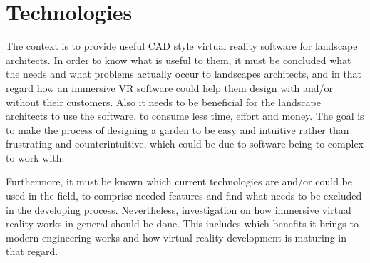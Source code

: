 	\section{Technologies}\label{sec:technologies}
		The context is to provide useful CAD style virtual reality software for landscape architects. In order to know what is useful to them, it must be concluded what the needs and what problems actually occur to landscapes architects, and in that regard how an immersive VR software could help them design with and/or without their customers. Also it needs to be beneficial for the landscape architects to use the software, to consume less time, effort and money. The goal is to make the process of designing a garden to be easy and intuitive rather than frustrating and counterintuitive, which could be due to software being to complex to work with.
	
		Furthermore, it must be known which current technologies are and/or could be used in the field, to comprise needed features and find what needs to be excluded in the developing process. Nevertheless, investigation on how immersive virtual reality works in general should be done. This includes which benefits it brings to modern engineering works and how virtual reality development is maturing in that regard.		
			
	

